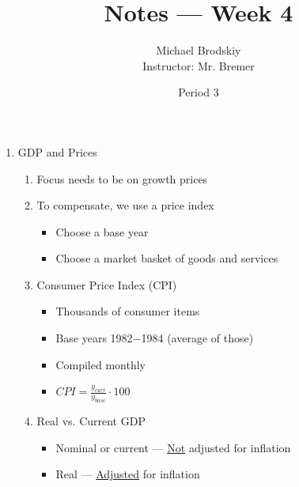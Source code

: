 \documentclass[12pt]{article}
\title{Notes — Week 4}
\date{Period 3}
\author{Michael Brodskiy\\ \small Instructor: Mr. Bremer}
\begin{document}
\maketitle

\begin{enumerate}

  \item GDP and Prices

    \begin{enumerate}

      \item Focus needs to be on growth  prices

      \item To compensate, we use a price index

        \begin{itemize}

          \item Choose a base year

          \item Choose a market basket of goods and services

        \end{itemize}

      \item Consumer Price Index (CPI)

        \begin{itemize}

          \item Thousands of consumer items

          \item Base years 1982$-$1984 (average of those)

          \item Compiled monthly

          \item $CPI = \frac{y_{curr}}{y_{base}}\cdot100$

        \end{itemize}

      \item Real vs. Current GDP

        \begin{itemize}

          \item Nominal or current — \underline{Not} adjusted for inflation

          \item Real — \underline{Adjusted} for inflation


\end{itemize}
\end{enumerate}
\end{enumerate}
\end{document}
